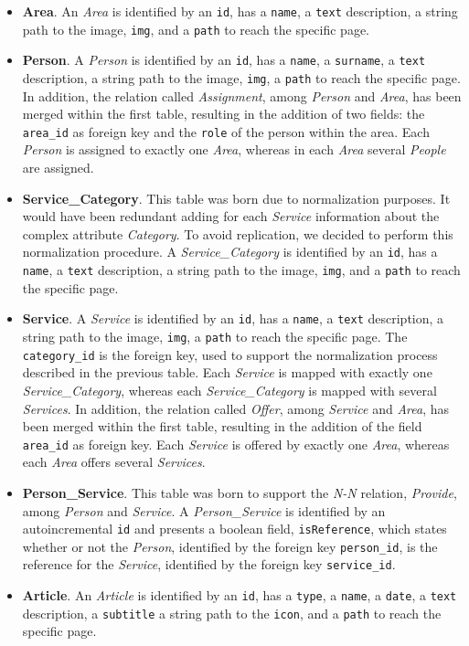 \documentclass[12pt]{report}
\begin{document}
\begin{itemize}
	\item \textbf{Area}. An \emph{Area} is identified by an \texttt{id}, 
	has a \texttt{name}, a \texttt{text} description, a string path to the image, 
	\texttt{img}, and a \texttt{path} to reach the specific page. 
	\item \textbf{Person}. A \emph{Person} is identified by an \texttt{id}, 
	has a \texttt{name}, a \texttt{surname}, a \texttt{text} description, a 
	string path to the image, \texttt{img}, a \texttt{path} to reach the specific page.
	In addition, the relation called \emph{Assignment}, among \emph{Person} and \emph{Area}, has
	been merged within the first table, resulting in the addition of two fields: the 
	\texttt{area\_id} as foreign key and the \texttt{role} of the person within the area.
	Each \emph{Person} is assigned to exactly one \emph{Area}, whereas in each \emph{Area} several
	\emph{People} are assigned.
	\item \textbf{Service\_Category}. This table was born due to normalization purposes. 
	It would have been redundant adding for each \emph{Service} information about the complex 
	attribute \emph{Category}. To avoid replication, we decided to perform this normalization 
	procedure. A \emph{Service\_Category} is identified by an \texttt{id}, 
	has a \texttt{name}, a \texttt{text} description, a string path to the image, 
	\texttt{img}, and a \texttt{path} to reach the specific page. 
	\item \textbf{Service}. A \emph{Service} is identified by an \texttt{id}, 
	has a \texttt{name}, a \texttt{text} description, a string path to the image, \texttt{img}, 
	a \texttt{path} to reach the specific page.
	The \texttt{category\_id} is the foreign key, used to support the normalization process 
	described in the previous table. 
	Each \emph{Service} is mapped with exactly one \emph{Service\_Category}, whereas each 
	\emph{Service\_Category} is mapped with several \emph{Services}.
	In addition, the relation called \emph{Offer}, among 
	\emph{Service} and \emph{Area}, has	been merged within the first table, resulting in 
	the addition of the field \texttt{area\_id} as foreign key.
	Each \emph{Service} is offered by exactly one \emph{Area}, whereas each \emph{Area} offers 
	several \emph{Services}.
	\item \textbf{Person\_Service}. This table was born to support the \emph{N-N} relation, 
	\emph{Provide}, among \emph{Person} and \emph{Service}. A \emph{Person\_Service} is 
	identified by an autoincremental \texttt{id} and presents a boolean field, \texttt{isReference}, 
	which states whether or not the \emph{Person}, identified by the foreign key \texttt{person\_id}, 
	is the reference for the \emph{Service}, identified by the foreign key \texttt{service\_id}.
	\item \textbf{Article}. An \emph{Article} is identified by an \texttt{id}, has a 
	\texttt{type}, a \texttt{name}, a \texttt{date}, a \texttt{text} description, a \texttt{subtitle} 
	a string path to the \texttt{icon}, and a \texttt{path} to reach the specific page. 
\end{itemize}
\end{document}
